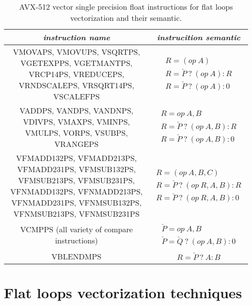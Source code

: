 \documentclass[
11pt,%
tightenlines,%
twoside,%
onecolumn,%
nofloats,%
nobibnotes,%
nofootinbib,%
superscriptaddress,%
noshowpacs,%
centertags]%
{revtex4}
\begin{document}
\begin{table}[!h]
\setcaptionmargin{0mm}
\onelinecaptionsfalse
{}
\caption{AVX-512 vector single precision float instructions for flat loops vectorization and their semantic.}
\bigskip
\begin{tabular}{|c|c|}
\hline
\textit{instruction name} & \textit{instrucition semantic} \\
\hline
\parbox{10cm}{VMOVAPS, VMOVUPS, VSQRTPS, VGETEXPPS, VGETMANTPS, VRCP14PS, VREDUCEPS, VRNDSCALEPS, VRSQRT14PS, VSCALEFPS} & $\begin{matrix} R = (op \ A) \\ R = \check{P} \ ? \ (op \ A) : R \\ R = \check{P} \ ? \ (op \ A) : 0 \end{matrix}$ \\
\hline
\parbox{10cm}{VADDPS, VANDPS, VANDNPS, VDIVPS, VMAXPS, VMINPS, VMULPS, VORPS, VSUBPS, VRANGEPS} & $\begin{matrix} R = op \ A, B \\ R = \check{P} \ ? \ (op \ A, B) : R \\ R = \check{P} \ ? \ (op \ A, B) : 0 \end{matrix}$ \\
\hline
\parbox{10cm}{VFMADD132PS, VFMADD213PS, VFMADD231PS, VFMSUB132PS, VFMSUB213PS, VFMSUB231PS, VFNMADD132PS, VFNMADD213PS, VFNMADD231PS, VFNMSUB132PS, VFNMSUB213PS, VFNMSUB231PS} & $\begin{matrix} R = (op \ A, B, C) \\ R = \check{P} \ ? \ (op \ R, A, B) : R \\ R = \check{P} \ ? \ (op \ R, A, B) : 0 \end{matrix}$ \\
\hline
\parbox{10cm}{VCMPPS (all variety of compare instructions)} & $\begin{matrix} \check{P} = op \ A, B \\ \check{P} = \check{Q} \ ? \ (op \ A, B) : 0 \end{matrix}$ \\
\hline
\parbox{10cm}{VBLENDMPS} & $\begin{matrix} R = \check{P} \ ? \ A : B \end{matrix}$ \\
\hline
\end{tabular}
\label{tab:avx512instructions}
\end{table}   
    
\section{Flat loops vectorization techniques}
\end{document}
